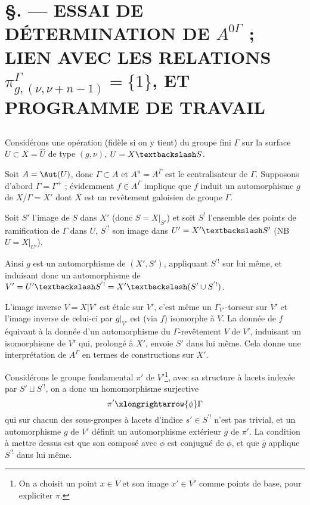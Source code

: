 \chapter*{\S {}. --- ESSAI DE DÉTERMINATION DE $A^{0\Gamma}$ ; LIEN AVEC LES RELATIONS ${\pi^\Gamma_{g,(\nu,\nu+n-1)}} =\{1\}$, ET PROGRAMME DE TRAVAIL}\thispagestyle{empty}
\label{sec:24}
\section*{}

Considérons une opération (fidèle si on y tient) du groupe fini $\Gamma$ sur la surface $U \subset  X = \widehat{U}$ de type $(g, \nu)$, $U = X \textbackslash S$.

Soit $A = \Aut(U)$, donc $\Gamma \subset  A$ et $A^u = A^\Gamma$ est le centralisateur de $\Gamma$. Supposons d'abord $\Gamma = \Gamma^+$ ; évidemment $f \in A^\Gamma$ implique que $f$ induit un automorphisme $g$ de $X/\Gamma = X'$ dont $X$ est un revêtement galoisien de groupe $\Gamma$.

Soit $S'$ l'image de $S$ dans $X'$ (donc $S = X|_{S'}$) et soit $S^!$ l'ensemble des points de ramification de $\Gamma$ dans $U$, $S^{'!}$ son image dans $U' = X' \textbackslash S'$ (NB $U = X|_{U'}$).

Ainsi $g$ est un automorphisme de $(X', S')$, appliquant $S^{'!}$ sur lui même, et induisant donc un automorphisme de $V' = U' \textbackslash S^{'!} = X' \textbackslash (S' \cup S^{'!})$.

L'image inverse $V = X | V'$ est étale sur $V'$, c'est même un $\Gamma_{V'}$-torseur sur $V'$ et l'image inverse de celui-ci par $g |_{V'}$ est (via $f$) isomorphe à $V$. La donnée de $f$ équivaut à la donnée d'un automorphisme du $\Gamma$-revêtement $V$ de $V'$, induisant un isomorphisme de $V'$ qui, prolongé à $X'$, envoie $S'$ dans lui même. Cela donne une interprétation de $A^\Gamma$ en termes de constructions sur $X'$.

Considérons le groupe fondamental $\pi'$ de $V'$\footnote{On a choisit un point $x \in V$ et son image $x' \in V'$ comme points de base, pour expliciter $\pi$.}, avec sa structure à lacets indexée par $S' \sqcup S^{'!}$, on a donc un homomorphisme surjective
$$
\pi' \xlongrightarrow{\phi} \Gamma
$$
qui sur chacun des sous-groupes à lacets d'indice $s' \in S^{'!}$ n'est pas trivial, et un automorphisme $g$ de $V'$ définit un automorphisme extérieur $\overline{g}$ de $\pi'$. La condition à mettre dessus est que son composé avec $\phi$ est conjugué de $\phi$, et que $\overline{g}$ applique $S^{'!}$ dans lui même.

